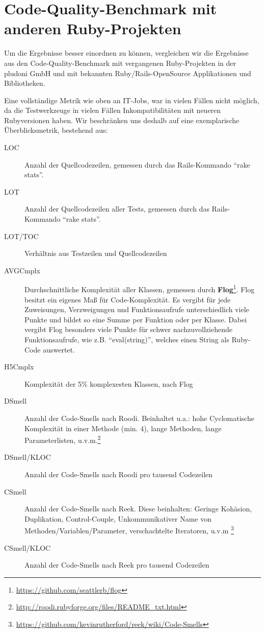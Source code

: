 

\section{Code-Quality-Benchmark mit anderen Ruby-Projekten}

Um die Ergebnisse besser einordnen zu können, vergleichen wir die Ergebnisse aus den Code-Quality-Benchmark mit vergangenen Ruby-Projekten in der pludoni GmbH und mit bekannten Ruby/Rails-OpenSource Applikationen und Bibliotheken.

Eine vollständige Metrik wie oben an IT-Jobs, war in vielen Fällen nicht möglich, da die Testwerkzeuge in vielen Fällen Inkompatibilitäten mit neueren Rubyversionen haben. Wir beschränken uns deshalb auf eine exemplarische Überblicksmetrik, bestehend aus:

\begin{description}
 \item[LOC] Anzahl der Quellcodezeilen, gemessen durch das Rails-Kommando "`rake stats"'. 
 \item[LOT] Anzahl der Quellcodezeilen aller Tests, gemessen durch das Rails-Kommando "`rake stats"'. 
 \item[LOT/TOC] Verhältnis aus Testzeilen und Quellcodezeilen
 \item[AVGCmplx] Durchschnittliche Komplexität aller Klassen, gemessen durch \textbf{Flog}\footnote{\url{https://github.com/seattlerb/flog}}. Flog besitzt ein eigenes Maß für Code-Komplexität. Es vergibt für jede Zuweisungen, Verzweigungen und Funktionsaufrufe unterschiedlich viele Punkte und bildet so eine Summe per Funktion oder per Klasse. Dabei vergibt Flog besonders viele Punkte für schwer nachzuvollziehende Funktionsaufrufe, wie z.B. "`eval(string)"', welches einen String als Ruby-Code auswertet.
 \item[H5Cmplx] Komplexität der 5\% komplexesten Klassen, nach Flog
 \item[DSmell] Anzahl der Code-Smells nach Roodi. Beinhaltet u.a.: hohe Cyclomatische Komplexität in einer Methode (min. 4), lange Methoden, lange Parameterlisten, u.v.m.\footnote{\url{http://roodi.rubyforge.org/files/README_txt.html}}
 \item[DSmell/KLOC] Anzahl der Code-Smells nach Roodi pro tausend Codezeilen
 \item[CSmell] Anzahl der Code-Smells nach Reek. Diese beinhalten: Geringe Kohäsion, Duplikation, Control-Couple, Unkommunikativer Name von Methoden/Variablen/Parameter, verschachtelte Iteratoren, u.v.m  \footnote{\url{https://github.com/kevinrutherford/reek/wiki/Code-Smells}}
 \item[CSmell/KLOC] Anzahl der Code-Smells nach Reek pro tausend Codezeilen
\end{description}







